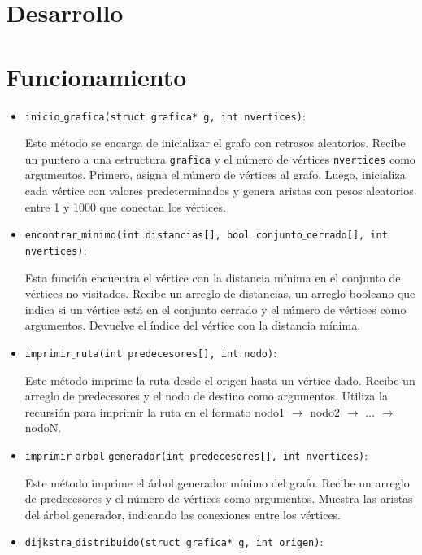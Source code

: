 \documentclass[a4paper,12pt]{article}
\begin{document}
\section*{Desarrollo}


\section*{Funcionamiento}

\begin{itemize}
    \item \texttt{inicio$\_$grafica(struct grafica* g, int nvertices)}:
    
    Este método se encarga de inicializar el grafo con retrasos aleatorios. Recibe un puntero a una estructura \texttt{grafica} y el número de vértices \texttt{nvertices} como argumentos. Primero, asigna el número de vértices al grafo. Luego, inicializa cada vértice con valores predeterminados y genera aristas con pesos aleatorios entre 1 y 1000 que conectan los vértices.

    \item \texttt{encontrar$\_$minimo(int distancias[], bool conjunto$\_$cerrado[], int nvertices)}: 
    
    Esta función encuentra el vértice con la distancia mínima en el conjunto de vértices no visitados. Recibe un arreglo de distancias, un arreglo booleano que indica si un vértice está en el conjunto cerrado y el número de vértices como argumentos. Devuelve el índice del vértice con la distancia mínima.

    \item \texttt{imprimir$\_$ruta(int predecesores[], int nodo)}:
    
    Este método imprime la ruta desde el origen hasta un vértice dado. Recibe un arreglo de predecesores y el nodo de destino como argumentos. Utiliza la recursión para imprimir la ruta en el formato nodo1 $\rightarrow$ nodo2 $\rightarrow$ ... $\rightarrow$ nodoN.

    \item \texttt{imprimir$\_$arbol$\_$generador(int predecesores[], int nvertices)}: 
    
    Este método imprime el árbol generador mínimo del grafo. Recibe un arreglo de predecesores y el número de vértices como argumentos. Muestra las aristas del árbol generador, indicando las conexiones entre los vértices.

    \item \texttt{dijkstra$\_$distribuido(struct grafica* g, int origen)}: 
    

\end{itemize}
\end{document}
